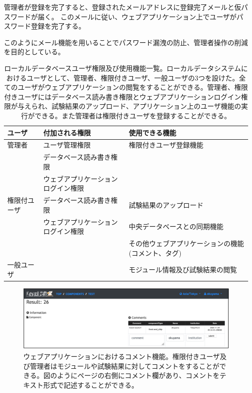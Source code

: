 管理者が登録を完了すると、登録されたメールアドレスに登録完了メールと仮パスワードが届く。
このメールに従い、ウェブアプリケーション上でユーザがパスワード登録を完了する。

このようにメール機能を用いることでパスワード漏洩の防止、管理者操作の削減を目的としている。

\clearpage
\begin{table}[btp]
\begin{center}
\caption[ローカルデータベースユーザ権限及び使用機能一覧]{ローカルデータベースユーザ権限及び使用機能一覧。ローカルデータシステムにおけるユーザとして、管理者、権限付きユーザ、一般ユーザの3つを設けた。全てのユーザがウェブアプリケーションの閲覧をすることができる。管理者、権限付きユーザにはデータベース読み書き権限とウェブアプリケーションログイン権限が与えられ、試験結果のアップロード、アプリケーション上のユーザ機能の実行ができる。また管理者は権限付きユーザを登録することができる。}
\label{user_functions_summary}
  \small
  \begin{tabular}{|lll|} \hline
    ユーザ       & 付加される権限                               & 使用できる機能 \\ \hline
    管理者       & ユーザ管理権限                     & 権限付きユーザ登録機能\\ 
                 & データベース読み書き権限           & \\ 
                 & ウェブアプリケーションログイン権限 & \\ \hline
    権限付ユーザ & データベース読み書き権限           & 試験結果のアップロード\\ 
                 & ウェブアプリケーションログイン権限 & 中央データベースとの同期機能\\ 
                 &                                    & その他ウェブアプリケーションの機能(コメント、タグ)\\ \hline
    一般ユーザ   &                                    & モジュール情報及び試験結果の閲覧　\\ \hline
  \end{tabular}
\end{center}
\end{table}

\begin{figure}[btp]\centering
\includegraphics[width=12cm]{./viewer_comment.png}
\caption[ウェブアプリケーションにおけるコメント機能]{ウェブアプリケーションにおけるコメント機能。権限付きユーザ及び管理者はモジュールや試験結果に対してコメントをすることができる。図のようにページの右側にコメント欄があり、コメントをテキスト形式で記述することができる。}
\label{webapp_comment}
\end{figure}

